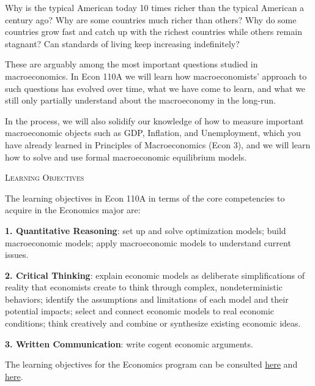 \documentclass[11pt]{article}
\begin{document}
\noindent Why is the typical American today 10 times richer than the typical American a century ago? Why are some countries much richer than others? Why do some countries grow fast and catch up with the richest countries while others remain stagnant? Can standards of living keep increasing indefinitely?

\noindent These are arguably among the most important questions studied in macroeconomics. In Econ 110A we will learn how macroeconomists' approach to such questions has evolved over time, what we have come to learn, and what we still only partially understand about the macroeconomy in the long-run.

\noindent In the process, we will also solidify our knowledge of how to measure important macroeconomic objects such as GDP, Inflation, and Unemployment, which you have already learned in Principles of Macroeconomics (Econ 3), and we will learn how to solve and use formal macroeconomic equilibrium models.


\newpage

\bigskip
\noindent\textsc{Learning Objectives}

\smallskip

\noindent The learning objectives in Econ 110A in terms of the core competencies to acquire in the Economics major are:

\smallskip

\noindent \textbf{1. Quantitative Reasoning}: set up and solve optimization models; build macroeconomic models; apply macroeconomic models to understand current issues. 

\medskip

\noindent \textbf{2. Critical Thinking}: explain economic models as deliberate simplifications of reality that economists create to think through complex, nondeterministic behaviors; identify the assumptions and limitations of each model and their potential impacts; select and connect economic models to real
economic conditions; think creatively and combine or synthesize existing economic ideas.

\medskip

\noindent \textbf{3. Written Communication}: write cogent economic arguments. 

\medskip

\noindent The learning objectives for the Economics program can be consulted \href{https://economics.ucsd.edu/undergraduate-program/major-minor-requirements/economics-major-ba.html}{here} and \href{https://dev-academicaffairs.ucsd.edu/_files/ug-ed/asmnt/lo-programs-core-comp/Economics_IEEI_CC.pdf}{here}.
\end{document}
